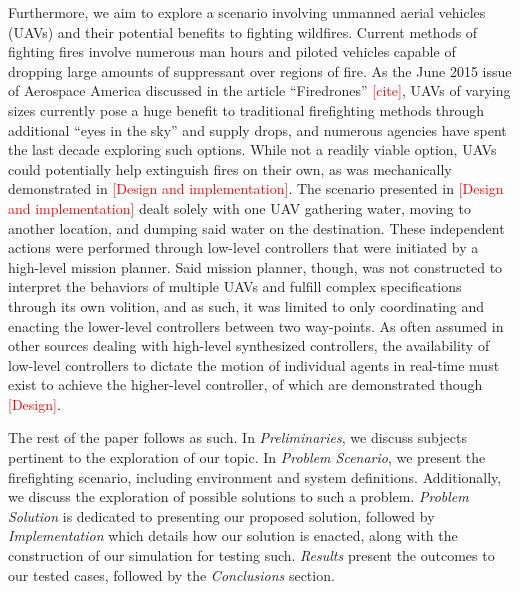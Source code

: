 \documentclass[journal]{IEEEtran}
\begin{document}
Furthermore, we aim to explore a scenario involving unmanned aerial vehicles (UAVs) and their potential benefits to fighting wildfires. Current methods of fighting fires involve numerous man hours and piloted vehicles capable of dropping large amounts of suppressant over regions of fire. As the June 2015 issue of Aerospace America discussed in the article “Firedrones” \textcolor{red}{[cite]}, UAVs of varying sizes currently pose a huge benefit to traditional firefighting methods through additional “eyes in the sky” and supply drops, and numerous agencies have spent the last decade exploring such options. While not a readily viable option, UAVs could potentially help extinguish fires on their own, as was mechanically demonstrated in \textcolor{red}{[Design and implementation]}. The scenario presented in \textcolor{red}{[Design and implementation]} dealt solely with one UAV gathering water, moving to another location, and dumping said water on the destination. These independent actions were performed through low-level controllers that were initiated by a high-level mission planner. Said mission planner, though, was not constructed to interpret the behaviors of multiple UAVs and fulfill complex specifications through its own volition, and as such, it was limited to only coordinating and enacting the lower-level controllers between two way-points. As often assumed in other sources dealing with high-level synthesized controllers, the availability of low-level controllers to dictate the motion of individual agents in real-time must exist to achieve the higher-level controller, of which are demonstrated though \textcolor{red}{[Design]}.


The rest of the paper follows as such. In \textit{Preliminaries}, we discuss subjects pertinent to the exploration of our topic. In \textit{Problem Scenario}, we present the firefighting scenario, including environment and system definitions. Additionally, we discuss the exploration of possible solutions to such a problem. \textit{Problem Solution} is dedicated to presenting our proposed solution, followed by \textit{Implementation} which details how our solution is enacted, along with the construction of our simulation for testing such. \textit{Results} present the outcomes to our tested cases, followed by the \textit{Conclusions} section.%
\end{document}
